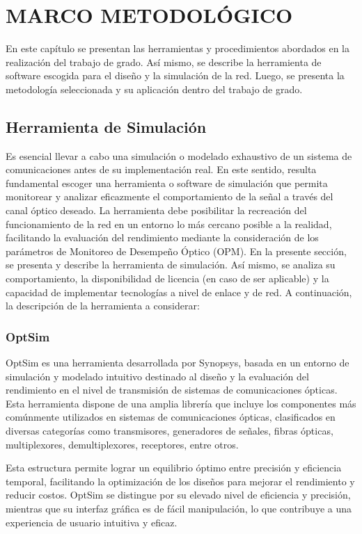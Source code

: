 \chapter[MARCO METODOLÓGICO]{\Large MARCO METODOLÓGICO}
\label{chap2:marco}

En este capítulo se presentan las herramientas y procedimientos abordados en la
realización del trabajo de grado. Así mismo, se describe la herramienta de software
escogida para el diseño y la simulación de la red. Luego, se presenta la metodología seleccionada y su aplicación dentro del trabajo de grado.

\section{Herramienta de Simulación}

Es esencial llevar a cabo una simulación o modelado exhaustivo de un sistema de comunicaciones antes de su implementación real. En este sentido, resulta fundamental escoger una herramienta o software de simulación que permita monitorear y analizar eficazmente el comportamiento de la señal a través del canal óptico deseado. La herramienta debe posibilitar la recreación del funcionamiento de la red en un entorno lo más cercano posible a la realidad, facilitando la evaluación del rendimiento mediante la consideración de los parámetros de Monitoreo de Desempeño Óptico (OPM). 
En la presente sección, se presenta y describe la herramienta de simulación. Así mismo, se analiza su comportamiento, la disponibilidad de licencia (en caso de ser aplicable) y la capacidad de implementar tecnologías a nivel de enlace y de red. A continuación, la descripción de la herramienta a considerar:

\subsection{OptSim}

OptSim es una herramienta desarrollada por Synopsys, basada en un entorno de simulación y modelado intuitivo destinado al diseño y la evaluación del rendimiento en el nivel de transmisión de sistemas de comunicaciones ópticas. Esta herramienta dispone de una amplia librería que incluye los componentes más comúnmente utilizados en sistemas de comunicaciones ópticas, clasificados en diversas categorías como transmisores, generadores de señales, fibras ópticas, multiplexores, demultiplexores, receptores, entre otros.

Esta estructura permite lograr un equilibrio óptimo entre precisión y eficiencia temporal, facilitando la optimización de los diseños para mejorar el rendimiento y reducir costos. OptSim se distingue por su elevado nivel de eficiencia y precisión, mientras que su interfaz gráfica es de fácil manipulación, lo que contribuye a una experiencia de usuario intuitiva y eficaz.
